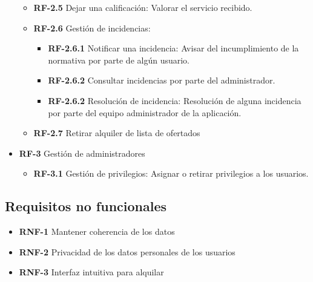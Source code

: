 \documentclass[11pt,spanish]{article} %
\begin{document}
\begin{itemize}
\begin{itemize}
\begin{itemize}
		\end{itemize}
		\item \textbf{RF-2.5} Dejar una calificación: Valorar el servicio recibido.
		\item \textbf{RF-2.6} Gestión de incidencias: 
		\begin{itemize}
			\item \textbf{RF-2.6.1} Notificar una incidencia: Avisar del incumplimiento de la normativa por parte de algún usuario.
			\item \textbf{RF-2.6.2} Consultar incidencias por parte del administrador.
			\item \textbf{RF-2.6.2} Resolución de incidencia: Resolución de alguna incidencia por parte del equipo administrador de la aplicación.	
		\end{itemize}
		\item \textbf{RF-2.7} Retirar alquiler de lista de ofertados
	\end{itemize}

	\item \textbf{RF-3} Gestión de administradores
	\begin{itemize}
		\item \textbf{RF-3.1} Gestión de privilegios: Asignar o retirar privilegios a los usuarios.
	\end{itemize}
\end{itemize}

\subsection{Requisitos no funcionales}
\begin{itemize}
	\item \textbf{RNF-1} Mantener coherencia de los datos
	\item \textbf{RNF-2} Privacidad de los datos personales de los usuarios
	\item \textbf{RNF-3} Interfaz intuitiva para alquilar	
\end{itemize}
\end{document}
